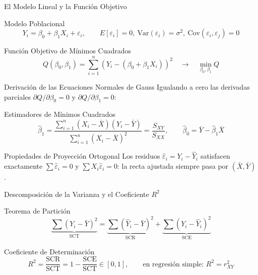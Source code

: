 \documentclass[10pt, aspectratio=169]{beamer}
\begin{document}
\begin{frame}{El Modelo Lineal y la Función Objetivo}
  \footnotesize
  \begin{block}{Modelo Poblacional}
    $$Y_i=\beta_0+\beta_1 X_i+\varepsilon_i, \qquad E[\varepsilon_i]=0,\ \text{Var}(\varepsilon_i)=\sigma^2,\ \text{Cov}(\varepsilon_i,\varepsilon_j)=0$$
  \end{block}
  \pause

  \vspace{0.1cm}
  \begin{alertblock}{Función Objetivo de Mínimos Cuadrados}
    $$Q(\beta_0,\beta_1)=\sum_{i=1}^n\left(Y_i-(\beta_0+\beta_1 X_i)\right)^2 \quad \longrightarrow \quad \min_{\beta_0,\beta_1} Q$$
  \end{alertblock}
\end{frame}

\begin{frame}{Derivación de las Ecuaciones Normales de Gauss}
  \footnotesize
  Igualando a cero las derivadas parciales $\partial Q/\partial\beta_0=0$ y $\partial Q/\partial\beta_1=0$: \pause

  \vspace{0.1cm}
  \begin{block}{Estimadores de Mínimos Cuadrados}
    $$\hat\beta_1=\frac{\sum_{i=1}^n(X_i-\bar X)(Y_i-\bar Y)}{\sum_{i=1}^n(X_i-\bar X)^2}=\frac{S_{XY}}{S_{XX}}, \qquad \hat\beta_0=\bar Y-\hat\beta_1\bar X$$
  \end{block}
  \pause

  \vspace{0.05cm}
  \begin{alertblock}{Propiedades de Proyección Ortogonal}
    Los residuos $\hat\varepsilon_i=Y_i-\hat Y_i$ satisfacen exactamente $\sum\hat\varepsilon_i=0$ y $\sum X_i\hat\varepsilon_i=0$: la recta ajustada siempre pasa por $(\bar X,\bar Y)$.
  \end{alertblock}
\end{frame}

\begin{frame}{Descomposición de la Varianza y el Coeficiente $R^2$}
  \footnotesize
  \begin{block}{Teorema de Partición}
    $$\underbrace{\sum(Y_i-\bar Y)^2}_{\text{SCT}} = \underbrace{\sum(\hat Y_i-\bar Y)^2}_{\text{SCR}} + \underbrace{\sum(Y_i-\hat Y_i)^2}_{\text{SCE}}$$
  \end{block}
  \pause

  \vspace{0.1cm}
  \begin{alertblock}{Coeficiente de Determinación}
    $$R^2=\frac{\text{SCR}}{\text{SCT}}=1-\frac{\text{SCE}}{\text{SCT}} \in[0,1], \qquad \text{en regresión simple: } R^2=r_{XY}^2$$
  \end{alertblock}
\end{frame}
\end{document}
